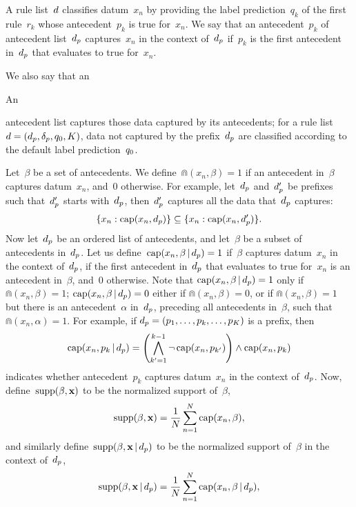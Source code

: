 A rule list~${d}$ classifies datum~$x_n$ by providing the label prediction~$q_k$
of the first rule~$r_k$ whose antecedent~$p_k$ is true for~$x_n$.
%
We say that an antecedent~$p_k$ of antecedent list~$d_p$ captures~$x_n$
in the context of~$d_p$ if~$p_k$ is the first antecedent in~$d_p$ that
evaluates to true for~$x_n$.
%
\begin{arxiv}
We also say that an
\end{arxiv}
\begin{kdd}
An
\end{kdd}
antecedent list captures those data captured by its antecedents;
for a rule list~${{d} = (d_p, \delta_p, q_0, K)}$,
data not captured by the prefix~$d_p$
are classified according to the default label prediction~$q_0$.

Let~$\beta$ be a set of antecedents.
%
We define~${\Cap(x_n, \beta) = 1}$ if an antecedent in~$\beta$
captures datum~$x_n$, and~0 otherwise.
%
For example, let~$d_p$ and~$d_p'$ be prefixes such that~$d_p'$ starts
with~$d_p$, then~$d_p'$ captures all the data that~$d_p$ captures:
\begin{align}
\{x_n: \Cap(x_n, \Prefix)\} \subseteq \{x_n: \Cap(x_n, \Prefix')\}.
\label{eq:cap-subset}
\end{align}
%
Now let~$d_p$ be an ordered list of antecedents,
and let~$\beta$ be a subset of antecedents in~$d_p$.
%
Let us define~${\textnormal{cap}(x_n, \beta \,|\, d_p) = 1}$ if~$\beta$
captures datum~$x_n$ in the context of~$d_p$,
\ie if the first antecedent in~$d_p$ that evaluates to true for~$x_n$
is an antecedent in~$\beta$, and~0 otherwise.
%
Note that ${\textnormal{cap}(x_n, \beta \,|\, d_p) = 1}$ only if ${\Cap(x_n, \beta) = 1}$;
${\textnormal{cap}(x_n, \beta \,|\, d_p) = 0}$ either if ${\Cap(x_n, \beta) = 0}$,
or if ${\Cap(x_n, \beta) = 1}$ but there is an antecedent~$\alpha$ in~$d_p$,
preceding all antecedents in~$\beta$, such that ${\Cap(x_n, \alpha) = 1}$.
%
For example, if ${d_p = (p_1, \dots, p_k, \dots, p_K)}$ is a prefix, then
\begin{align}
\Cap(x_n, p_k \given \Prefix) =
  \left(\bigwedge_{k'=1}^{k - 1} \neg\, \Cap(x_n, p_{k'}) \right)
  \wedge \Cap(x_n, p_k)
\end{align}
indicates whether antecedent~$p_k$ captures datum~$x_n$ in the context of~$d_p$.
%
Now, define~${\textnormal{supp}(\beta, \mathbf{x})}$ to be the normalized support of~$\beta$,
\begin{align}
\Supp(\beta, \x) = \frac{1}{N} \sum_{n=1}^N \Cap(x_n, \beta),
\label{eq:support}
\end{align}
and similarly define~${\textnormal{supp}(\beta, \mathbf{x} \,|\, d_p)}$
to be the normalized support of~$\beta$ in the context of~$d_p$,
\begin{align}
\Supp(\beta, \x \given \Prefix) = \frac{1}{N} \sum_{n=1}^N \Cap(x_n, \beta \given \Prefix),
\label{eq:support-context}
\end{align}

